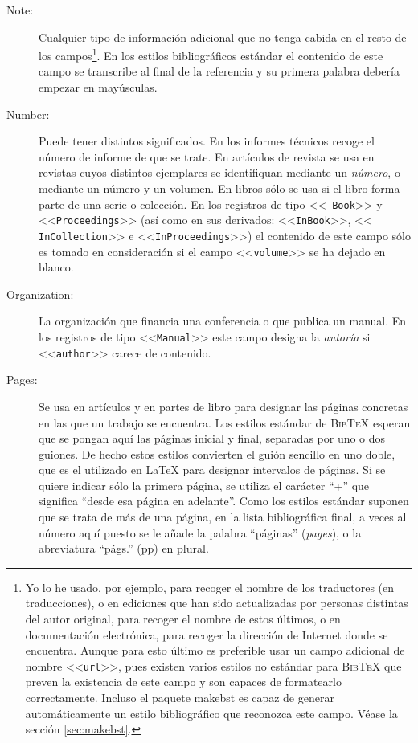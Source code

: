 \documentclass[a4paper,11pt]{article}
\def\btx-{\textsc{Bib\TeX}}
\def\ltx-{\LaTeX}
\def\ltr#1-{<<\texttt{#1}>>}
\begin{document}
\begin{description}
\item[Note:] Cualquier tipo de información adicional que no tenga cabida en el
  resto de  los campos\footnote{Yo lo he  usado, por ejemplo,  para recoger el
    nombre de los  traductores (en traducciones), o en  ediciones que han sido
    actualizadas por  personas distintas del  autor original, para  recoger el
    nombre de estos  últimos, o en documentación electrónica,  para recoger la
    dirección  de Internet  donde se  encuentra.  Aunque  para esto  último es
    preferible  usar un  campo adicional  de  nombre \ltr  url-, pues  existen
    varios estilos  no estándar  para \btx- que  preven la existencia  de este
    campo  y son  capaces de  formatearlo correctamente.   Incluso  el paquete
    makebst es  capaz de generar  automáticamente un estilo  bibliográfico que
    reconozca  este  campo.  Véase  la  sección  \ref{sec:makebst}.}.  En  los
  estilos bibliográficos estándar el contenido  de este campo se transcribe al
  final de la referencia y su primera palabra debería empezar en mayúsculas.

\item[Number:] Puede  tener distintos  significados. En los  informes técnicos
  recoge el número de informe de que  se trate. En artículos de revista se usa
  en  revistas   cuyos  distintos  ejemplares  se   identifiquan  mediante  un
  \emph{número}, o mediante  un número y un volumen. En libros  sólo se usa si
  el libro forma parte de una serie o colección. En los registros de tipo \ltr
  Book- y  \ltr Proceedings-  (así como en  sus derivados: \ltr  InBook-, \ltr
  InCollection-  e \ltr  InProceedings-) el  contenido de  este campo  sólo es
  tomado en consideración si el campo \ltr volume- se ha dejado en blanco.

\item[Organization:]  La  organización  que  financia una  conferencia  o  que
  publica un manual.  En los registros de tipo \ltr Manual- este campo designa
  la \emph{autoría} si \ltr author- carece de contenido.

\item[Pages:]  Se usa  en artículos  y en  partes de  libro para  designar las
  páginas concretas en  las que un trabajo se  encuentra. Los estilos estándar
  de \btx- esperan  que se pongan aquí las páginas  inicial y final, separadas
  por uno o dos guiones.  De  hecho estos estilos convierten el guión sencillo
  en  uno doble,  que es  el utilizado  en \ltx-  para designar  intervalos de
  páginas. Si se quiere indicar sólo la primera página, se utiliza el carácter
  ``+''  que significa  ``desde esa  página en  adelante''.  Como  los estilos
  estándar  suponen  que  se  trata  de   más  de  una  página,  en  la  lista
  bibliográfica final,  a veces al número  aquí puesto se le  añade la palabra
  ``páginas'' (\emph{pages}), o la abreviatura ``págs.'' (pp) en plural.


\end{description}
\end{document}
